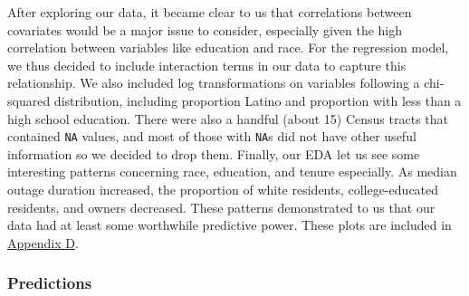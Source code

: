 \documentclass[
]{article}
\begin{document}
\begin{table}

\caption{\label{tab:unnamed-chunk-3}Very High Correlations Amongst Covariates}
\centering
{}
\end{table}

After exploring our data, it became clear to us that correlations
between covariates would be a major issue to consider, especially given
the high correlation between variables like education and race. For the
regression model, we thus decided to include interaction terms in our
data to capture this relationship. We also included log transformations
on variables following a chi-squared distribution, including proportion
Latino and proportion with less than a high school education. There were
also a handful (about 15) Census tracts that contained \texttt{NA}
values, and most of those with \texttt{NA}s did not have other useful
information so we decided to drop them. Finally, our EDA let us see some
interesting patterns concerning race, education, and tenure especially.
As median outage duration increased, the proportion of white residents,
college-educated residents, and owners decreased. These patterns
demonstrated to us that our data had at least some worthwhile predictive
power. These plots are included in
\protect\hyperlink{appendixD}{Appendix D}.

\hypertarget{predictions}{%
\subsubsection{Predictions}\label{predictions}}
\end{document}
